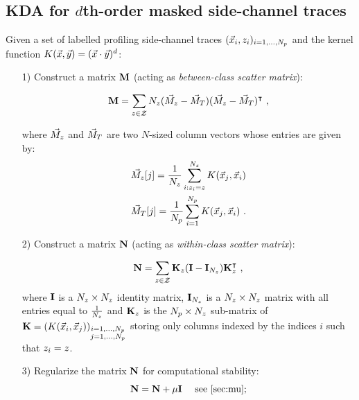 \subsection{KDA for $d$th-order masked side-channel traces}\label{sec:KDA}
Given a set of labelled profiling side-channel traces $(\vLeakVec_i, \sensVar_i)_{i=1, \dots , \nbProfilingTraces}$ and the kernel function $K(\vLeakVec,\yyy)= (\vLeakVec \cdot \yyy)^d$:
\begin{itemize}

\item[1)] Construct a matrix $\MMM$ (acting as \emph{between-class scatter matrix}):

\begin{equation}
\MMM = \sum_{\sensVar\in\sensVarSet}\nbTracesPerClass(\MMMclass - \MMMT)(\MMMclass-\MMMT)^\intercal\mbox{ ,}
\end{equation}

where $\MMMclass$ and $\MMMT$ are two $N$-sized column vectors whose entries are given by:
\begin{align}
\MMMclass[\sensVar][j] = \frac{1}{\nbTracesPerClass}\sum_{i:\sensVar_i=\sensVar}^{\nbTracesPerClass}K(\vLeakVec_j,\vLeakVec_i)\\
\MMMT[j] = \frac{1}{\nbProfilingTraces}\sum_{i=1}^{\nbProfilingTraces}K(\vLeakVec_{j},\vLeakVec_{i}) \mbox{ .}
\end{align}


\item[2)] Construct a matrix $\NNN$ (acting as \emph{within-class scatter matrix}):

\begin{equation}\label{eq:N}
\NNN = \sum_{\sensVar\in\sensVarSet}\kernelMatrix_\sensVar(\III - \III_{\nbTracesPerClass})\kernelMatrix_\sensVar^\intercal\mbox{ ,}
\end{equation}
where $\III$ is a $\nbTracesPerClass \times \nbTracesPerClass$ identity matrix, $\III_{\nbTracesPerClass}$ is a $\nbTracesPerClass \times \nbTracesPerClass$ matrix with all entries equal to $\frac{1}{\nbTracesPerClass}$ and $\kernelMatrix_{\sensVar}$ is the $\nbProfilingTraces \times \nbTracesPerClass$ sub-matrix of $\kernelMatrix = (K(\vLeakVec_i,\vLeakVec_j))_{\substack{i=1,\dots,\nbProfilingTraces \\ j=1,\dots,\nbProfilingTraces}}$ storing only columns indexed by the indices $i$ such that $\sensVar_i=\sensVar$. 

\item[3)] Regularize the  matrix $\NNN$ for computational stability:
\begin{equation}\label{eq:mu}
\NNN = \NNN + \mu  \III \quad \mbox{ see \ref{sec:mu};}
\end{equation}


\end{itemize}

